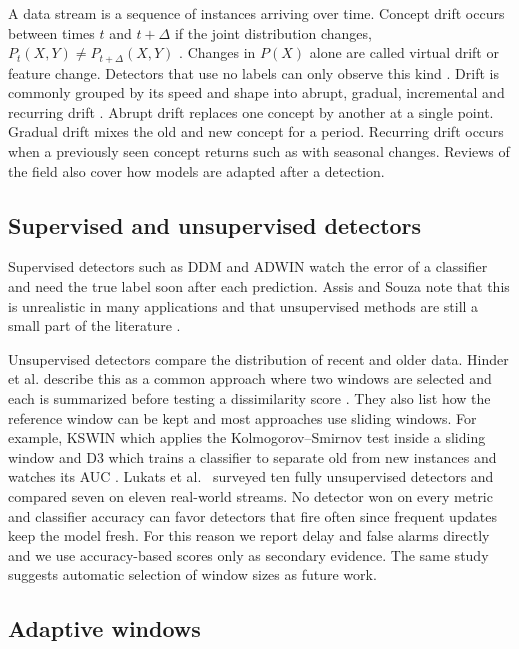 \documentclass[conference]{IEEEtran}
\begin{document}
A data stream is a sequence of instances arriving over time. Concept drift occurs between times $t$ and $t+\Delta$ if the joint distribution changes, $P_t(X,Y)\neq P_{t+\Delta}(X,Y)$ \cite{gama2014}. Changes in $P(X)$ alone are called virtual drift or feature change. Detectors that use no labels can only observe this kind \cite{assis2025}. Drift is commonly grouped by its speed and shape into abrupt, gradual, incremental and recurring drift \cite{webb2016,suarez2023}. Abrupt drift replaces one concept by another at a single point. Gradual drift mixes the old and new concept for a period. Recurring drift occurs when a previously seen concept returns such as with seasonal changes. Reviews of the field \cite{gama2014,lu2019} also cover how models are adapted after a detection.

\subsection{Supervised and unsupervised detectors}

Supervised detectors such as DDM \cite{gama2004} and ADWIN \cite{bifet2007} watch the error of a classifier and need the true label soon after each prediction. Assis and Souza note that this is unrealistic in many applications and that unsupervised methods are still a small part of the literature \cite{assis2025}.

Unsupervised detectors compare the distribution of recent and older data. Hinder et al. describe this as a common approach where two windows are selected and each is summarized before testing a dissimilarity score \cite{hinder2024a}. They also list how the reference window can be kept and most approaches use sliding windows. For example, KSWIN which applies the Kolmogorov--Smirnov test inside a sliding window \cite{raab2020} and D3 which trains a classifier to separate old from new instances and watches its AUC \cite{gozuacik2019}. Lukats et al.\ \cite{lukats2025} surveyed ten fully unsupervised detectors and compared seven on eleven real-world streams. No detector won on every metric and classifier accuracy can favor detectors that fire often since frequent updates keep the model fresh. For this reason we report delay and false alarms directly and we use accuracy-based scores only as secondary evidence. The same study suggests automatic selection of window sizes as future work.

\subsection{Adaptive windows}
\end{document}
